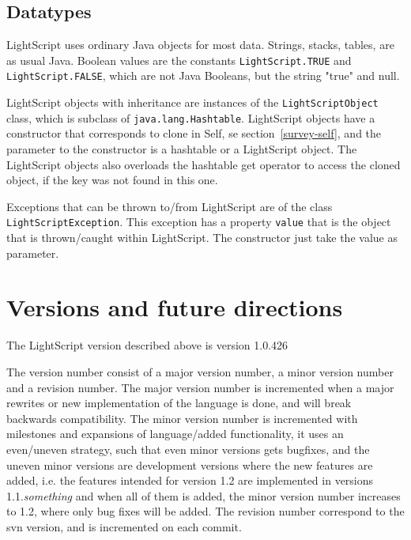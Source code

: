 \documentclass[11pt]{report}
\begin{document}
\subsection{Datatypes}
LightScript uses ordinary Java objects for most data.
Strings, stacks, tables, are as usual Java.
Boolean values are the constants \verb|LightScript.TRUE| and \verb|LightScript.FALSE|, which are not Java Booleans, but the string "true" and null.

LightScript objects with inheritance are instances of the \verb|LightScriptObject| class, which is subclass of \verb|java.lang.Hashtable|. LightScript objects have a constructor that corresponds to clone in Self, se section~\ref{survey-self}, and the parameter to the constructor is a hashtable or a LightScript object. The LightScript objects also overloads the hashtable get operator to access the cloned object, if the key was not found in this one.

Exceptions that can be thrown to/from LightScript are of the class \verb|LightScriptException|. This exception has a property \verb|value| that is the object that is thrown/caught within LightScript. The constructor just take the value as parameter.

\section{Versions and future directions}
The LightScript version described above is version 1.0.426

The version number consist of a major version number, a minor version number and a revision number.
The major version number is incremented when a major rewrites or new implementation of the language is done, and will break backwards compatibility.
The minor version number is incremented with milestones and expansions of language/added functionality, it uses an even/uneven strategy, such that even minor versions gets bugfixes, and the uneven minor versions are development versions where the new features are added, i.e. 
the features intended for version 1.2 are implemented in versions 1.1.\emph{something} and when all of them is added, the minor version number increases to 1.2, where only bug fixes will be added.
The revision number correspond to the svn version, and is incremented on each commit.
\end{document}

